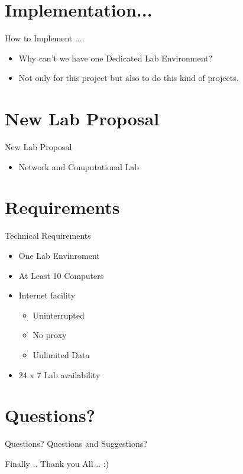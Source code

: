 \documentclass[xcolor=dvipsnames]{beamer}
\begin{document}
\section{Implementation...}
\begin{frame}{How to Implement ....}
\begin{itemize}
	\item Why can't we have one Dedicated Lab Environment?
	\item Not only for this project but also to do this kind of projects.
	
\end{itemize}
\end{frame}

\section{New Lab Proposal }
\begin{frame}{New Lab Proposal }
\begin{itemize}
	\item Network and Computational Lab
\end{itemize}
\end{frame}

\section{Requirements}
\begin{frame}{Technical Requirements}
\begin{itemize}
	\item One Lab Envinroment
	\item At Least 10 Computers
	\item Internet facility
		\begin{itemize}
			\item Uninterrupted
			\item No proxy 
			\item Unlimited Data
		\end{itemize}
	\item 24 x 7 Lab availability
\end{itemize}
\end{frame}

\section{Questions?}
\begin{frame}{Questions?}
\centering
Questions and Suggestions? 
\end{frame}


\begin{frame}{Finally ..}
Thank you All .. :)
\end{frame}
\end{document}
